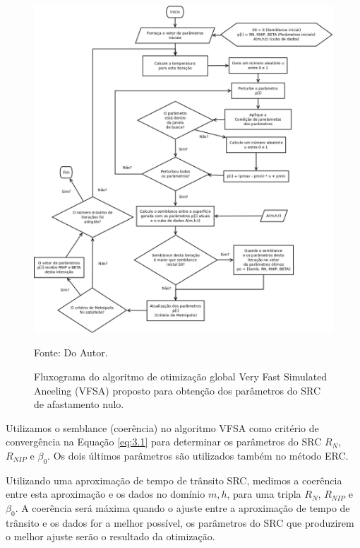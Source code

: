 \vspace{\onelineskip} 

\begin{figure}[htb]
\caption{Fluxograma do algoritmo de otimização global Very Fast Simulated Aneeling (VFSA)
proposto para obtenção dos parâmetros do SRC de afastamento nulo.}
\begin{center}
\includegraphics[scale=0.45]{images/VFSA.png}
\vspace{-0.3cm}
\end{center}
\begin{center}
 Fonte: Do Autor.
\end{center}
\label{fig:3.1}
\end{figure}

Utilizamos o semblance (coerência) no algoritmo VFSA como critério de convergência na Equação \ref{eq:3.1}
para determinar os parâmetros do SRC $R_N$, $R_{NIP}$ e $\beta_0$. Os dois últimos parâmetros são utilizados também 
no método ERC.

Utilizando uma aproximação de tempo de trânsito SRC, medimos a coerência entre esta aproximação e os
dados no domínio $m, h$, para uma tripla $R_N$, $R_{NIP}$ e $\beta_0$.
A coerência será máxima quando o ajuste entre a aproximação de tempo de trânsito e os dados
for a melhor possível, os parâmetros do SRC que produzirem o melhor ajuste serão o resultado da otimização.

